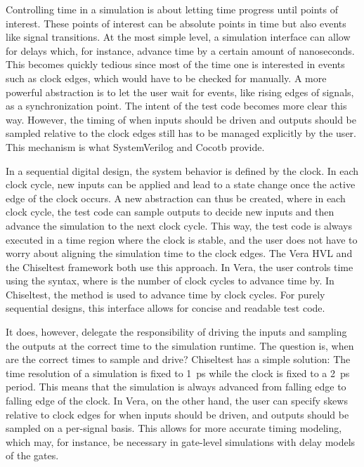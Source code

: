 Controlling time in a simulation is about letting time progress until points of interest. These points of interest can
be absolute points in time but also events like signal transitions. At the most simple level, a simulation interface
can allow for delays which, for instance, advance time by a certain amount of nanoseconds. This becomes quickly
tedious since most of the time one is interested in events such as clock edges, which would have to be checked for
manually. A more powerful abstraction is to let the user wait for events, like rising edges of signals, as a
synchronization point. The intent of the test code becomes more clear this way. However, the timing of when inputs
should be driven and outputs should be sampled relative to the clock edges still has to be managed explicitly by the
user. This mechanism is what SystemVerilog and Cocotb provide.

In a sequential digital design, the system behavior is defined by the clock. In each clock cycle, new inputs can be
applied and lead to a state change once the active edge of the clock occurs. A new abstraction can thus be created,
where in each clock cycle, the test code can sample outputs to decide new inputs and then advance the simulation to
the next clock cycle. This way, the test code is always executed in a time region where the clock is stable, and the
user does not have to worry about aligning the simulation time to the clock edges. The Vera \cite[Sec. 7]{flake2020a}
HVL and the Chiseltest \cite{chiseltest} framework both use this approach. In Vera, the user controls time using the
 syntax, where  is the number of clock cycles to advance time by. In Chiseltest, the
 method is used to advance time by  clock cycles. For purely sequential designs, this
interface allows for concise and readable test code.

It does, however, delegate the responsibility of driving the inputs and sampling the outputs at the correct time to the simulation
runtime. The question is, when are the correct times to sample and
drive? Chiseltest has a simple solution: The time resolution of a simulation is fixed to \SI{1}{ps} while the clock
is fixed to a \SI{2}{ps} period. This means that the simulation is always advanced from falling edge to falling edge
of the clock. In Vera, on the other hand, the user can specify skews relative to clock edges for when inputs should be driven, and outputs should be sampled on a per-signal basis. This allows for more accurate timing modeling, which may, for instance, be necessary in gate-level simulations with delay models of the gates.

